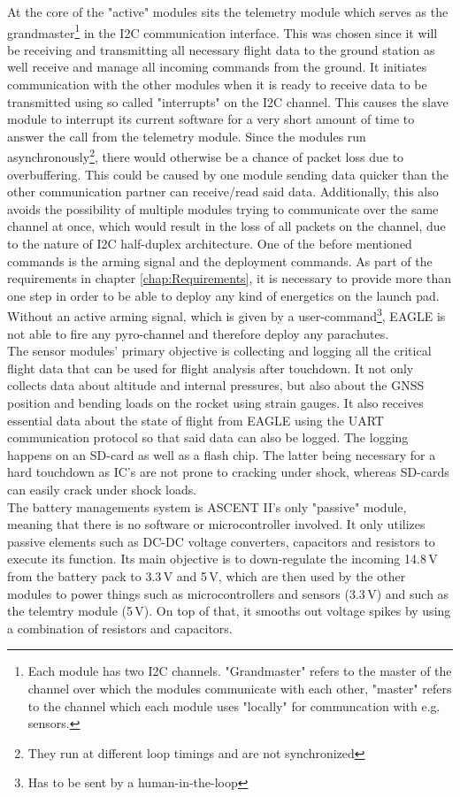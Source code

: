 \documentclass[fontsize=11pt,%
twoside,%
BCOR          = 8mm, %
DIV           = 11,  %
titlepage     = off,%
index=totoc,%
xcolor        = pdftex,%
dvipsnames,%
bibliography  = totoc,%
bibliography = numbered, %
listof        = notnumbered]{scrreprt}
\begin{document}
At the core of the "active" modules sits the telemetry module which serves as the grandmaster\footnote{Each module has two I2C channels. "Grandmaster" refers to the master of the channel over which the modules communicate with each other, "master" refers to the channel which each module uses "locally" for communcation with e.g. sensors.} in the I2C communication interface. This was chosen since it will be receiving and transmitting all necessary flight data to the ground station as well receive and manage all incoming commands from the ground. It initiates communication with the other modules when it is ready to receive data to be transmitted using so called "interrupts" on the I2C channel. This causes the slave module to interrupt its current software for a very short amount of time to answer the call from the telemetry module. Since the modules run asynchronously\footnote{They run at different loop timings and are not synchronized}, there would otherwise be a chance of packet loss due to overbuffering. This could be caused by one module sending data quicker than the other communication partner can receive/read said data. Additionally, this also avoids the possibility of multiple modules trying to communicate over the same channel at once, which would result in the loss of all packets on the channel, due to the nature of I2C half-duplex architecture. One of the before mentioned commands is the arming signal and the deployment commands. As part of the requirements in chapter \ref{chap:Requirements}, it is necessary to provide more than one step in order to be able to deploy any kind of energetics on the launch pad. Without an active arming signal, which is given by a user-command\footnote{Has to be sent by a human-in-the-loop}, EAGLE is not able to fire any pyro-channel and therefore deploy any parachutes.\\
The sensor modules' primary objective is collecting and logging all the critical flight data that can be used for flight analysis after touchdown. It not only collects data about altitude and internal pressures, but also about the GNSS position and bending loads on the rocket using strain gauges. It also receives essential data about the state of flight from EAGLE using the UART communication protocol so that said data can also be logged. The logging happens on an SD-card as well as a flash chip. The latter being necessary for a hard touchdown as IC's are not prone to cracking under shock, whereas SD-cards can easily crack under shock loads.\\
The battery managements system is ASCENT II's only "passive" module, meaning that there is no software or microcontroller involved. It only utilizes passive elements such as DC-DC voltage converters, capacitors and resistors to execute its function. Its main objective is to down-regulate the incoming 14.8\,V from the battery pack to 3.3\,V and 5\,V, which are then used by the other modules to power things such as microcontrollers and sensors (3.3\,V) and such as the telemtry module (5\,V). On top of that, it smooths out voltage spikes by using a combination of resistors and capacitors.\\
\end{document}

